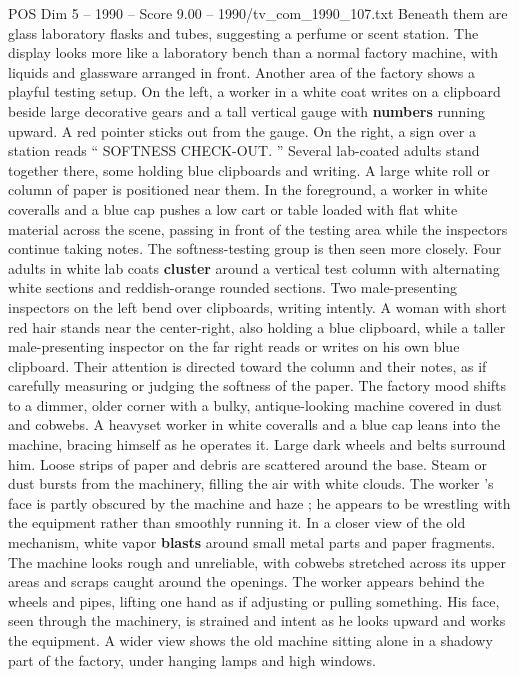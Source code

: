 \begin{textsample}{POS Dim 5 – 1990 – Score 9.00 – 1990/tv\_com\_1990\_107.txt}
Beneath them are glass laboratory flasks and tubes, suggesting a perfume or scent station.
The display looks more like a laboratory bench than a normal factory machine, with liquids and glassware arranged in front.
Another area of the factory shows a playful testing setup.
On the left, a worker in a white coat writes on a clipboard beside large decorative gears and a tall vertical gauge with \textbf{numbers} running upward.
A red pointer sticks out from the gauge.
On the right, a sign over a station reads “ SOFTNESS CHECK-OUT. ” Several lab-coated adults stand together there, some holding blue clipboards and writing.
A large white roll or column of paper is positioned near them.
In the foreground, a worker in white coveralls and a blue cap pushes a low cart or table loaded with flat white material across the scene, passing in front of the testing area while the inspectors continue taking notes.
The softness-testing group is then seen more closely.
Four adults in white lab coats \textbf{cluster} around a vertical test column with alternating white sections and reddish-orange rounded sections.
Two male-presenting inspectors on the left bend over clipboards, writing intently.
A woman with short red hair stands near the center-right, also holding a blue clipboard, while a taller male-presenting inspector on the far right reads or writes on his own blue clipboard.
Their attention is directed toward the column and their notes, as if carefully measuring or judging the softness of the paper.
The factory mood shifts to a dimmer, older corner with a bulky, antique-looking machine covered in dust and cobwebs.
A heavyset worker in white coveralls and a blue cap leans into the machine, bracing himself as he operates it.
Large dark wheels and belts surround him.
Loose strips of paper and debris are scattered around the base.
Steam or dust bursts from the machinery, filling the air with white clouds.
The worker ’s face is partly obscured by the machine and haze ; he appears to be wrestling with the equipment rather than smoothly running it.
In a closer view of the old mechanism, white vapor \textbf{blasts} around small metal parts and paper fragments.
The machine looks rough and unreliable, with cobwebs stretched across its upper areas and scraps caught around the openings.
The worker appears behind the wheels and pipes, lifting one hand as if adjusting or pulling something.
His face, seen through the machinery, is strained and intent as he looks upward and works the equipment.
A wider view shows the old machine sitting alone in a shadowy part of the factory, under hanging lamps and high windows.

\end{textsample}
